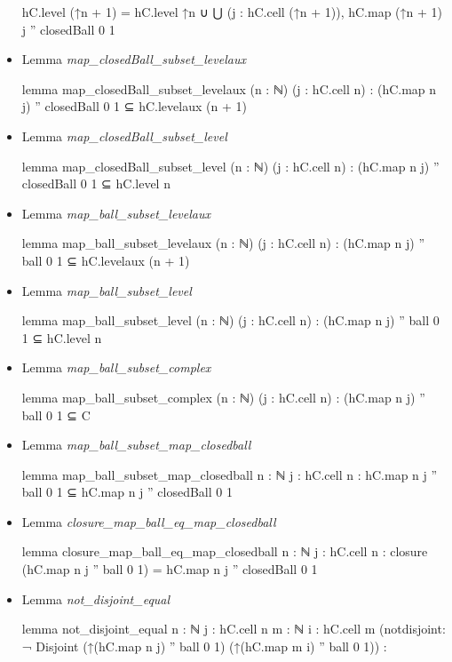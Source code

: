 \documentclass[colorinlistoftodos]{article}
\begin{document}
\begin{itemize}
\begin{leancode}
  hC.level (↑n + 1) =
  hC.level ↑n ∪ ⋃ (j : hC.cell (↑n + 1)), hC.map (↑n + 1) j '' closedBall 0 1
\end{leancode}
  \item Lemma \emph{map\_closedBall\_subset\_levelaux}
\begin{leancode}
lemma map_closedBall_subset_levelaux (n : ℕ) (j : hC.cell n) :
  (hC.map n j) '' closedBall 0 1 ⊆ hC.levelaux (n + 1)
\end{leancode}
  \item Lemma \emph{map\_closedBall\_subset\_level}
\begin{leancode}
lemma map_closedBall_subset_level (n : ℕ) (j : hC.cell n) :
  (hC.map n j) '' closedBall 0 1 ⊆ hC.level n
\end{leancode}
  \item Lemma \emph{map\_ball\_subset\_levelaux}
\begin{leancode}
lemma map_ball_subset_levelaux (n : ℕ) (j : hC.cell n) :
  (hC.map n j) '' ball 0 1 ⊆ hC.levelaux (n + 1)
\end{leancode}
  \item Lemma \emph{map\_ball\_subset\_level}
\begin{leancode}
lemma map_ball_subset_level (n : ℕ) (j : hC.cell n) :
  (hC.map n j) '' ball 0 1 ⊆ hC.level n
\end{leancode}
  \item Lemma \emph{map\_ball\_subset\_complex}
\begin{leancode}
lemma map_ball_subset_complex (n : ℕ) (j : hC.cell n) :
  (hC.map n j) '' ball 0 1 ⊆ C
\end{leancode}
  \item Lemma \emph{map\_ball\_subset\_map\_closedball}
\begin{leancode}
lemma map_ball_subset_map_closedball {n : ℕ} {j : hC.cell n} :
  hC.map n j '' ball 0 1 ⊆ hC.map n j '' closedBall 0 1
\end{leancode}
  \item Lemma \emph{closure\_map\_ball\_eq\_map\_closedball}
\begin{leancode}
lemma closure_map_ball_eq_map_closedball {n : ℕ} {j : hC.cell n} :
  closure (hC.map n j '' ball 0 1) = hC.map n j '' closedBall 0 1
\end{leancode}
  \item Lemma \emph{not\_disjoint\_equal}
\begin{leancode}
lemma not_disjoint_equal {n : ℕ} {j : hC.cell n} {m : ℕ} {i : hC.cell m}
(notdisjoint: ¬ Disjoint (↑(hC.map n j) '' ball 0 1) (↑(hC.map m i) '' ball 0 1)) :

\end{leancode}
\end{itemize}
\end{document}
